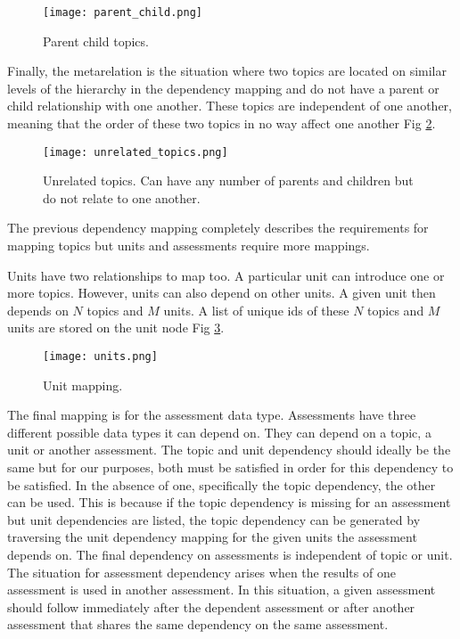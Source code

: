 \begin{figure}[ht]
    \centering
    \texttt{[image: parent\_child.png]}
    \caption[parent child topic.]{Parent child topics.}

    \label{fig:parent_child}
\end{figure}

Finally, the metarelation is the situation where two topics are located on similar levels of the hierarchy in the dependency mapping and do not have a parent or child relationship with one another. These topics are independent of one another, meaning that the order of these two topics in no way affect one another Fig \ref{fig:unrelated_topics}.

\pagebreak
\begin{figure}[ht]
    \centering
    \texttt{[image: unrelated\_topics.png]}
    \caption[Unrelated topics.]{Unrelated topics. Can have any number of parents and children but do not relate to one another.}
        
    \label{fig:unrelated_topics}
\end{figure}

The previous dependency mapping completely describes the requirements for mapping topics but units and assessments require more mappings.

Units have two relationships to map too. A particular unit can introduce one or more topics. However, units can also depend on other units. A given unit then depends on $N$ topics and $M$ units. A list of unique ids of these $N$ topics and $M$ units are stored on the unit node Fig \ref{fig:units}.

\begin{figure}[ht]
    \centering
    \texttt{[image: units.png]}
    \caption[Unit mapping.]{Unit mapping.}
        
    \label{fig:units}
\end{figure}

The final mapping is for the assessment data type. Assessments have three different possible data types it can depend on. They can depend on a topic, a unit or another assessment. The topic and unit dependency should ideally be the same but for our purposes, both must be satisfied in order for this dependency to be satisfied. In the absence of one, specifically the topic dependency, the other can be used. This is because if the topic dependency is missing for an assessment but unit dependencies are listed, the topic dependency can be generated by traversing the unit dependency mapping for the given units the assessment depends on. The final dependency on assessments is independent of topic or unit. The situation for assessment dependency arises when the results of one assessment is used in another assessment. In this situation, a given assessment should follow immediately after the dependent assessment or after another assessment that shares the same dependency on the same assessment.

